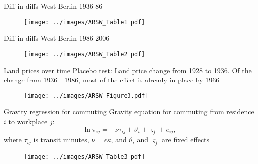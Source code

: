 \documentclass[10pt,notes=hide]{beamer}
\begin{document}
\begin{frame}{Diff-in-diffs West Berlin 1936-86}
\begin{figure}
\centering
  \texttt{[image: ../images/ARSW\_Table1.pdf]}
\end{figure}
\end{frame}
\begin{frame}{Diff-in-diffs West Berlin 1986-2006}
\begin{figure}
\centering
  \texttt{[image: ../images/ARSW\_Table2.pdf]}
\end{figure}
\end{frame}
\begin{frame}{Land prices over time}
Placebo test: Land price change from 1928 to 1936. 
Of the change from 1936 - 1986, most of the effect is already in place by 1966.
\begin{figure}
\centering
  \texttt{[image: ../images/ARSW\_Figure3.pdf]}
\end{figure}
\end{frame}
\begin{frame}{Gravity regression for commuting}
Gravity equation for commuting from residence $i$ to workplace $j$:
\begin{equation*}
\ln \pi_{ij} = - \nu \tau_{ij}  + \vartheta_{i} + \varsigma_{j} + e_{ij},
\label{gravity}
\end{equation*}
where $\tau_{ij}$ is transit minutes, $\nu = \epsilon \kappa$, and 
$\vartheta_{i}$ and  $\varsigma_{j}$ are fixed effects
\begin{figure}
\centering
  \texttt{[image: ../images/ARSW\_Table3.pdf]}
\end{figure}
\end{frame}
\end{document}
